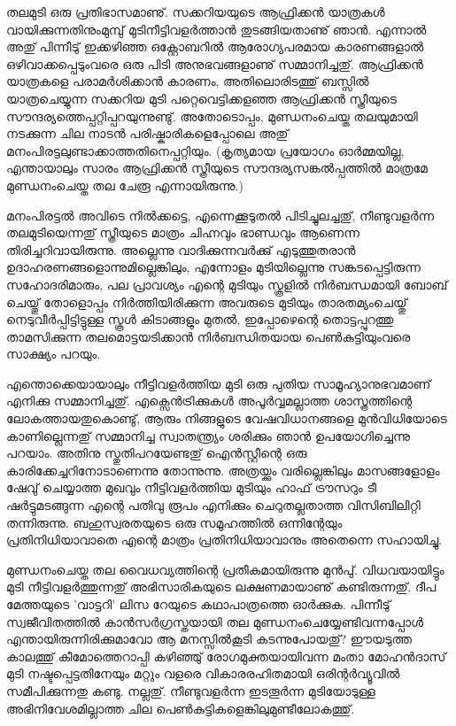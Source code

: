 ﻿
\enlargethispage*{2\baselineskip}
\setlength{\parskip}{2pt plus 1pt minus 1pt} %

തലമുടി ഒരു പ്രതിഭാസമാണു്. സക്കറിയയുടെ ആഫ്രിക്കന്‍ യാത്രകള്‍ വായിക്കുന്നതിനുംമുമ്പു് മുടിനീട്ടിവളര്‍ത്താന്‍ 
തുടങ്ങിയതാണു് ഞാന്‍. എന്നാല്‍ അതു് പിന്നീടു് ഇക്കഴിഞ്ഞ ഒക്റ്റോബറില്‍ ആരോഗ്യപരമായ കാരണങ്ങളാല്‍ 
ഒഴിവാക്കപ്പെടുംവരെ ഒരു പിടി അനുഭവങ്ങളാണു് സമ്മാനിച്ചതു്. ആഫ്രിക്കന്‍ യാത്രകളെ പരാമര്‍ശിക്കാന്‍ കാരണം, 
അതിലൊരിടത്തു് ബസ്സില്‍ യാത്രചെയ്യുന്ന സക്കറിയ മുടി പറ്റെവെട്ടിക്കളഞ്ഞ ആഫ്രിക്കന്‍ സ്ത്രീയുടെ 
സൗന്ദര്യത്തെപ്പറ്റിപ്പറയുന്നുണ്ടു്. അതോടൊപ്പം, മുണ്ഡനംചെയ്ത തലയുമായി നടക്കുന്ന ചില നാടന്‍ 
പരിഷ്കാരികളെപ്പോലെ അതു് മനംപിരട്ടലുണ്ടാക്കാത്തതിനെപ്പറ്റിയും. (കൃത്യമായ പ്രയോഗം ഓര്‍മ്മയില്ല, എന്തായാലും 
സാരം ആഫ്രിക്കന്‍ സ്ത്രീയുടെ സൗന്ദര്യസങ്കല്‍പ്പത്തില്‍ മാത്രമേ മുണ്ഡനംചെയ്ത തല ചേരൂ എന്നായിരുന്നു.)

മനംപിരട്ടല്‍ അവിടെ നില്‍ക്കട്ടെ, എന്നെക്കൂടുതല്‍ പിടിച്ചുലച്ചതു്, നീണ്ടുവളര്‍ന്ന തലമുടിയെന്നതു് സ്ത്രീയുടെ മാത്രം ചിഹ്നവും 
ഭാണ്ഡവും ആണെന്ന തിരിച്ചറിവായിരുന്നു. അല്ലെന്നു വാദിക്കുന്നവര്‍ക്കു് എടുത്തുതരാന്‍ ഉദാഹരണങ്ങളൊന്നുമില്ലെങ്കിലും, 
എന്നോളം മുടിയില്ലെന്നു സങ്കടപ്പെട്ടിരുന്ന സഹോദരിമാരും, പല പ്രാവശ്യം എന്റെ മുടിയും സ്കൂളില്‍ നിര്‍ബന്ധമായി ബോബ് 
ചെയ്തു് തോളൊപ്പം നിര്‍ത്തിയിരിക്കുന്ന അവരുടെ മുടിയും താരതമ്യംചെയ്തു് നെടുവീര്‍പ്പിട്ടിട്ടുള്ള സ്കൂള്‍ കിടാങ്ങളും മുതല്‍, 
ഇപ്പോഴെന്റെ തൊട്ടപ്പുറത്തു താമസിക്കുന്ന തലമൊട്ടയടിക്കാന്‍ നിര്‍ബന്ധിതയായ പെണ്‍കുട്ടിയുംവരെ സാക്ഷ്യം പറയും.

എന്തൊക്കെയായാലും നീട്ടിവളര്‍ത്തിയ മുടി ഒരു പുതിയ സാമൂഹ്യാനുഭവമാണ് എനിക്കു സമ്മാനിച്ചതു്. എക്സെന്‍ട്രിക്കുകള്‍ 
അപൂര്‍വ്വമല്ലാത്ത ശാസ്ത്രത്തിന്റെ ലോകത്തായതുകൊണ്ടു്, ആരും നിങ്ങളുടെ വേഷവിധാനങ്ങളെ മുന്‍വിധിയോടെ 
കാണില്ലെന്നതു് സമ്മാനിച്ച സ്വാതന്ത്ര്യം ശരിക്കും ഞാന്‍ ഉപയോഗിച്ചെന്നു പറയാം. അതിനു സ്തുതിപറയേണ്ടതു് ഐന്‍സ്റ്റീന്റെ 
ഒരു കാരിക്കേച്ചറിനോടാണെന്നു തോന്നുന്നു. അത്രയ്ക്കും വരില്ലെങ്കിലും മാസങ്ങളോളം ഷേവു് ചെയ്യാത്ത മുഖവും നീട്ടിവളര്‍ത്തിയ 
മുടിയും ഹാഫ് ട്രൗസറും ടീ ഷര്‍ട്ടുമടങ്ങുന്ന എന്റെ പതിവു രൂപം എനിക്കും ചെറുതല്ലതാത്ത വിസിബിലിറ്റി തന്നിരുന്നു. 
ബഹുസ്വരതയുടെ ഒരു സമൂഹത്തില്‍ ഒന്നിന്റേയും പ്രതിനിധിയാവാതെ എന്റെ മാത്രം പ്രതിനിധിയാവാനും 
അതെന്നെ സഹായിച്ചു.

മുണ്ഡനംചെയ്ത തല വൈധവ്യത്തിന്റെ പ്രതീകമായിരുന്നു മുന്‍പു്. വിധവയായിട്ടും മുടി നീട്ടിവളര്‍ത്തുന്നതു് അഭിസാരികയുടെ 
ലക്ഷണമായാണു് കണ്ടിരുന്നതു്. ദീപ മേത്തയുടെ 'വാട്ടറി' ലിസ റേയുടെ കഥാപാത്രത്തെ ഓര്‍ക്കുക. പിന്നീടു് 
സ്വജീവിതത്തില്‍ കാന്‍സര്‍ഗ്രസ്തയായി തല മുണ്ഡനംചെയ്യേണ്ടിവന്നപ്പോള്‍ എന്തായിരുന്നിരിക്കുമാവോ ആ മനസ്സില്‍കൂടി
കടന്നുപോയതു്? ഈയടുത്ത കാലത്തു് കീമോത്തെറാപ്പി കഴിഞ്ഞു് രോഗമുക്തയായിവന്ന മംതാ മോഹന്‍ദാസ് മുടി 
നഷ്ടപ്പെട്ടതിനേയും മറ്റും വളരെ വികാരരഹിതമായി ഒരിന്റര്‍വ്യൂവില്‍ സമീപിക്കുന്നതു കണ്ടു. നല്ലതു്. നീണ്ടുവളര്‍ന്ന ഇടതൂര്‍ന്ന 
മുടിയോടുള്ള അഭിനിവേശമില്ലാത്ത ചില പെണ്‍കുട്ടികളെങ്കിലുമുണ്ടീലോകത്തു്.

